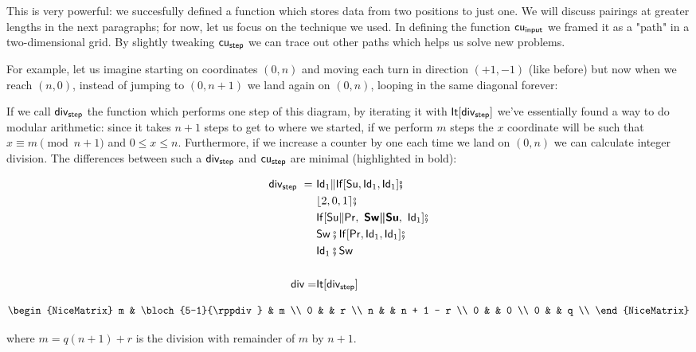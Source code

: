 \documentclass[runningheads]{llncs}
\begin{document}
This is very powerful: we succesfully defined a function which stores data from two positions to just one.
We will discuss pairings at greater lengths in the next paragraphs; for now, let us focus on the technique we used.
In defining the function $\mathsf{cu_{input}}$ we framed it as a "path" in a two-dimensional grid.
By slightly tweaking $\mathsf{cu_{step}}$ we can trace out other paths which helps us solve new problems.

For example, let us imagine starting on coordinates $(0,n)$ and moving each turn in direction $(+1,-1)$ (like before)
but now when we reach $(n,0)$, instead of jumping to $(0,n+1)$ we land again on $(0,n)$, looping in the same diagonal forever:


If we call $\mathsf{div_{step}}$ the function which performs one step of this diagram, by iterating it with $\mathsf{It}[\mathsf{div_{step}}]$
we've essentially found a way to do modular arithmetic: since it takes $n+1$ steps to get to where we started,
if we perform $m$ steps the $x$ coordinate will be such that $x \equiv m \pmod{n+1}$ and $0 \le x \le n$.
Furthermore, if we increase a counter by one each time we land on $(0,n)$ we can calculate integer division.
The differences between such a $\mathsf{div_{step}}$ and $\mathsf{cu_{step}}$ are minimal (highlighted in bold):

\noindent\begin{minipage}{.5\linewidth}
    \begin{align*}
        \mathsf{div_{step}} \ = \ & \mathsf{Id}_1 \Vert \mathsf{If}[\mathsf{Su}, \mathsf{Id}_1, \mathsf{Id}_1] \fatsemi \\
        & \lfloor 2, 0, 1 \rceil \fatsemi \\
        & \mathsf{If}[\mathsf{Su} \Vert \mathsf{Pr}, \ \boldsymbol{\mathsf{Sw} \Vert \mathsf{Su}}, \ \mathsf{Id}_1] \fatsemi \\
        & \mathsf{Sw} \fatsemi \mathsf{If}[\mathsf{Pr}, \mathsf{Id}_1, \mathsf{Id}_1] \fatsemi \\
        & \mathsf{Id}_1 \fatsemi \mathsf{Sw} \\
        \\
        \mathsf{div} =     & \mathsf{It}[\mathsf{div_{step}}] \\
    \end{align*}
\end{minipage}%
\begin{minipage}{.5\linewidth}
    \[\begin{NiceMatrix}
        m & \bloch{5-1}{\rppdiv} & m         \\
        0 &                      & r         \\
        n &                      & n + 1 - r \\
        0 &                      & 0         \\
        0 &                      & q         \\
    \end{NiceMatrix}\]
\end{minipage}
where $m = q(n + 1) + r$ is the division with remainder of $m$ by $n+1$.
\end{document}
